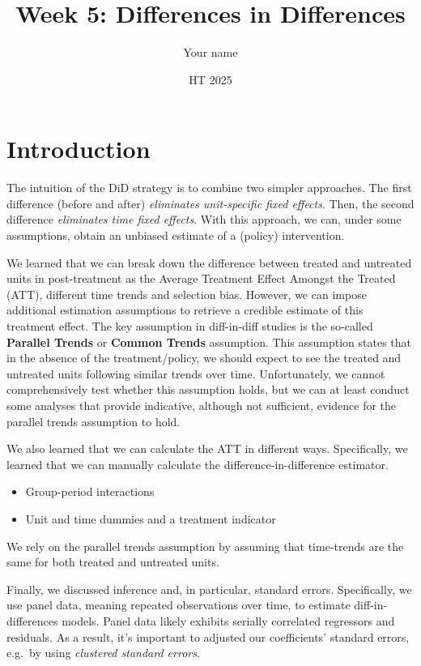\documentclass[
]{article}
\title{Week 5: Differences in Differences}
\author{Your name}
\date{HT 2025}
\providecommand{\tightlist}{%
  \setlength{\itemsep}{0pt}\setlength{\parskip}{0pt}}
\begin{document}
\maketitle

\section{Introduction}\label{introduction}

The intuition of the DiD strategy is to combine two simpler approaches.
The first difference (before and after) \emph{eliminates unit-specific
fixed effects}. Then, the second difference \emph{eliminates time fixed
effects}. With this approach, we can, under some assumptions, obtain an
unbiased estimate of a (policy) intervention.

We learned that we can break down the difference between treated and
untreated units in post-treatment as the Average Treatment Effect
Amongst the Treated (ATT), different time trends and selection bias.
However, we can impose additional estimation assumptions to retrieve a
credible estimate of this treatment effect. The key assumption in
diff-in-diff studies is the so-called \textbf{Parallel Trends} or
\textbf{Common Trends} assumption. This assumption states that in the
absence of the treatment/policy, we should expect to see the treated and
untreated units following similar trends over time. Unfortunately, we
cannot comprehensively test whether this assumption holds, but we can at
least conduct some analyses that provide indicative, although not
sufficient, evidence for the parallel trends assumption to hold.

We also learned that we can calculate the ATT in different ways.
Specifically, we learned that we can manually calculate the
difference-in-difference estimator.

\begin{itemize}
\tightlist
\item
  Group-period interactions
\item
  Unit and time dummies and a treatment indicator
\end{itemize}

We rely on the parallel trends assumption by assuming that time-trends
are the same for both treated and untreated units.

Finally, we discussed inference and, in particular, standard errors.
Specifically, we use panel data, meaning repeated observations over
time, to estimate diff-in-differences models. Panel data likely exhibits
serially correlated regressors and residuals. As a result, it's
important to adjusted our coefficients' standard errors, e.g.~by using
\emph{clustered standard errors}.
\end{document}
